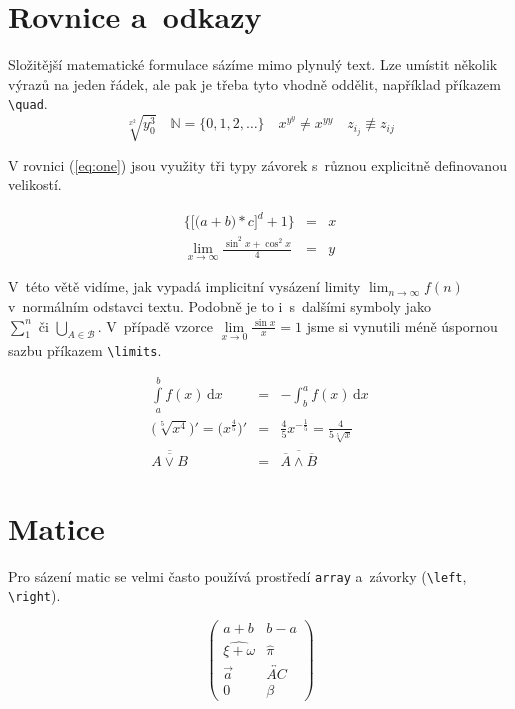 \documentclass[11pt,a4paper,twocolumn,titlepage]{article}
\theoremstyle{definition}
\theoremstyle{plain}
\begin{document}
\section{Rovnice a~odkazy}
Složitější matematické formulace sázíme mimo plynulý text. Lze umístit několik výrazů na jeden řádek, ale 
pak je třeba tyto vhodně oddělit, například příkazem \verb|\quad|.
$$\sqrt[x^2]{y^3_0} \quad \mathbb{N} = \{0, 1, 2,\dots\} \quad x^{y^y} \neq x^{yy}  \quad z_{i_j} \not\equiv z_{ij}$$

V rovnici (\ref{eq:one}) jsou využity tři typy závorek s~různou explicitně definovanou velikostí.

\begin{eqnarray} \label{eq:one}
\bigg\{\Big[\big(a+b\big)*c\Big]^d +1 \bigg\} & = & x \\
\lim_{x \rightarrow \infty}\frac{\sin^2 x + \cos^2 x}{4} & = & y \nonumber
\end{eqnarray}

V~této větě vidíme, jak vypadá implicitní vysázení li\-mity $\lim_{n\to\infty} f(n)$ v~normálním odstavci textu. 
Podobně je to i~s~dalšími symboly jako $\sum^n_1\mbox{ či }\bigcup_{A \in \mathcal{B}}$. 
V~případě vzorce $\lim\limits_{x \rightarrow 0} \frac{\sin x}{x} = 1$ jsme si vynutili méně úspornou\linebreak 
sazbu příkazem \verb|\limits|.

\begin{eqnarray}
\int\limits^b_a f(x)\,\mathrm{d}x & = & -\int^a_b f(x)\,\mathrm{d}x \\
\Big(\sqrt[5]{x^4}\Big)' = \Big(x^{\frac{4}{5}}\Big)' & = & {\frac{4}{5}}x^{-{\frac{1}{5}}} = \frac{4}{5\sqrt[5]{x}} \\
\overline{\overline{A \vee B}} & = & \overline{\overline{A}\wedge \overline{B}}
\end{eqnarray}

\section{Matice}
Pro sázení matic se velmi často používá prostředí \texttt{array} a~závorky (\verb|\left|, \verb|\right|).

$$ \left( \begin{array}{cc}
a+b & b-a \\
\widehat{\xi + \omega} & \hat{\pi} \\
\vec{a} & \overleftrightarrow{AC} \\
0 & \beta
\end{array} \right) $$
\end{document}
